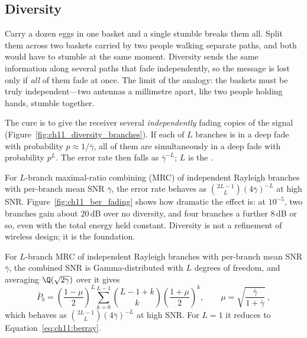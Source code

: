 


\subsection{Diversity}

\begin{analogy}
Carry a dozen eggs in one basket and a single stumble breaks them all. Split them across two
baskets carried by two people walking separate paths, and both would have to stumble at the same
moment. Diversity sends the same information along several paths that fade independently, so the
message is lost only if \emph{all} of them fade at once. The limit of the analogy: the baskets must
be truly independent---two antennas a millimetre apart, like two people holding hands, stumble
together.
\end{analogy}

The cure is to give the receiver several \emph{independently} fading copies of the signal
(Figure~\ref{fig:ch11_diversity_branches}). If each of $L$ branches is in a deep fade with
probability $p\approx1/\bar\gamma$, all of them are simultaneously in a deep fade with probability
$p^L$. The error rate then falls as $\bar\gamma^{-L}$; $L$ is the .


For $L$-branch maximal-ratio combining (MRC) of independent Rayleigh branches with per-branch mean
SNR $\bar\gamma$, the error rate behaves as $\binom{2L-1}{L}(4\bar\gamma)^{-L}$ at high SNR.
Figure~\ref{fig:ch11_ber_fading} shows how dramatic the effect is: at $10^{-5}$, two branches gain
about 20\,dB over no diversity, and four branches a further 8\,dB or so, even with the total energy
held constant. Diversity is not a refinement of wireless design; it is the foundation.

\begin{deeper}
For $L$-branch MRC of independent Rayleigh branches with per-branch mean SNR $\bar\gamma$, the
combined SNR is Gamma-distributed with $L$ degrees of freedom, and averaging
$\Q(\sqrt{2\gamma})$ over it gives
\begin{equation}
\bar P_b=\left(\frac{1-\mu}{2}\right)^L\sum_{k=0}^{L-1}\binom{L-1+k}{k}\left(\frac{1+\mu}{2}\right)^k,
\qquad \mu=\sqrt{\frac{\bar\gamma}{1+\bar\gamma}}\ ,
\end{equation}
which behaves as $\binom{2L-1}{L}(4\bar\gamma)^{-L}$ at high SNR. For $L=1$ it reduces to
Equation~\eqref{eq:ch11:berray}.
\end{deeper}

